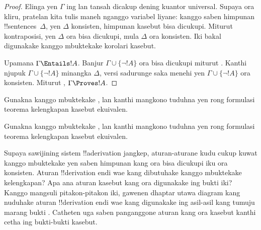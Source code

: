\documentclass[../../../include/open-logic-section]{subfiles}
\begin{document}
\begin{proof}
Elinga yen $\Gamma$ ing  lan
 tansah dicakup dening kuantor universal. Supaya ora kliru,
pratelan  kita tulis maneh nganggo variabel
liyane: kanggo saben himpunan !!{sentence}s~$\Delta$, yen $\Delta$
konsisten, himpunan kasebut bisa dicukupi. Miturut kontraposisi, yen
$\Delta$ ora bisa dicukupi, mula $\Delta$ ora konsisten. Iki bakal
digunakake kanggo mbuktekake korolari kasebut.

Upamana $\Gamma \Entails !A$. Banjur $\Gamma \cup \{\lnot !A\}$ ora
bisa dicukupi miturut . Kanthi
njupuk $\Gamma \cup \{\lnot !A\}$ minangka $\Delta$, versi sadurunge
saka  menehi yen $\Gamma \cup \{\lnot !A\}$
ora konsisten. Miturut
,
$\Gamma \Proves !A$.
\end{proof}

\begin{prob}
Gunakna  kanggo mbuktekake
, lan kanthi mangkono tuduhna
yen rong formulasi teorema kelengkapan kasebut ekuivalen.
\end{prob}
\tagendprob

\begin{prob}
Gunakna  kanggo mbuktekake
, lan kanthi mangkono tuduhna
yen rong formulasi teorema kelengkapan kasebut ekuivalen.
\end{prob}
\tagendprob

\begin{prob}
Supaya sawijining sistem !!a{derivation} jangkep, aturan-aturane kudu cukup kuwat
kanggo mbuktekake yen saben himpunan kang ora bisa dicukupi iku ora
konsisten. Aturan !!{derivation} endi wae kang dibutuhake kanggo
mbuktekake kelengkapan? Apa ana aturan kasebut kang ora digunakake ing
bukti iki? Kanggo mangsuli pitakon-pitakon iki, gawenen dhaptar utawa
diagram kang nuduhake aturan !!{derivation} endi wae kang digunakake ing
asil-asil kang tumuju marang bukti
. Catheten uga saben panganggone
aturan kang ora kasebut kanthi cetha ing bukti-bukti kasebut.
\end{prob}
\tagendprob
\end{document}
